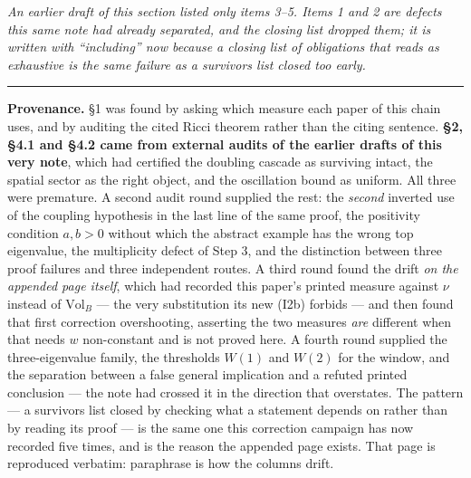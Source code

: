\documentclass[11pt]{article}
\begin{document}
\emph{An earlier draft of this section listed only items 3--5. Items 1 and 2 are
defects this same note had already separated, and the closing list dropped them; it is
written with ``including'' now because a closing list of obligations that reads as
exhaustive is the same failure as a survivors list closed too early.}

\vspace{4pt}
\noindent\rule{\textwidth}{0.8pt}

\noindent\footnotesize
\textbf{Provenance.} \S1 was found by asking which measure each paper of this chain
uses, and by auditing the cited Ricci theorem rather than the citing sentence.
\textbf{\S2, \S4.1 and \S4.2 came from external audits of the earlier drafts of this
very note}, which had certified the doubling cascade as surviving intact, the spatial
sector as the right object, and the oscillation bound as uniform. All three were
premature. A second audit round supplied the rest: the \emph{second} inverted use of
the coupling hypothesis in the last line of the same proof, the positivity condition
$a,b>0$ without which the abstract example has the wrong top eigenvalue, the
multiplicity defect of Step 3, and the distinction between three proof failures and
three independent routes. A third round found the drift \emph{on the appended page
itself}, which had recorded this paper's printed measure against $\nu$ instead of
$\mathrm{Vol}_B$ --- the very substitution its new (I2b) forbids --- and then found
that first correction overshooting, asserting the two measures \emph{are} different
when that needs $w$ non-constant and is not proved here. A fourth round supplied the
three-eigenvalue family, the thresholds $W(1)$ and $W(2)$ for the window, and the
separation between a false general implication and a refuted printed conclusion ---
the note had crossed it in the direction that overstates. The pattern --- a survivors list closed by checking what a
statement depends on rather than by reading its proof --- is the same one this
correction campaign has now recorded five times, and is the reason the appended page
exists. That page is reproduced verbatim: paraphrase is how the columns drift.
\end{document}
